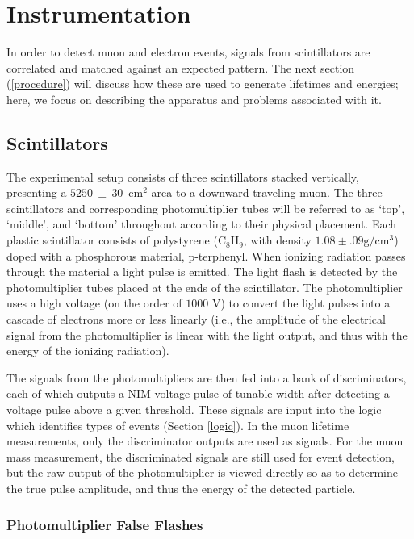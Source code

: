 \section{Instrumentation}
\label{instrumentation}

In order to detect muon and electron events, signals from scintillators are correlated and matched against an expected pattern. The next section (\ref{procedure}) will discuss how these are used to generate lifetimes and energies; here, we focus on describing the apparatus and problems associated with it.

\subsection{Scintillators}
\label{scintillators}

The experimental setup consists of three scintillators stacked vertically, presenting a $5250~\pm~30$~cm$^2$ area to a downward traveling muon. The three scintillators and corresponding photomultiplier tubes will be referred to as `top', `middle', and `bottom' throughout according to their physical placement.  Each plastic scintillator consists of polystyrene ($\mathrm{C}_{8}\mathrm{H}_{9}$, with density $1.08 \pm .09 {\mathrm{g}}/{\mathrm{cm}^{3}}$) doped with a phosphorous material, p-terphenyl. When ionizing radiation passes through the material a light pulse is emitted. The light flash is detected by the photomultiplier tubes placed at the ends of the scintillator. The photomultiplier uses a high voltage (on the order of $1000$ V) to convert the light pulses into a cascade of electrons more or less linearly (i.e., the amplitude of the electrical signal from the photomultiplier is linear with the light output, and thus with the energy of the ionizing radiation).

The signals from the photomultipliers are then fed into a bank of discriminators, each of which outputs a NIM voltage pulse of tunable width after detecting a voltage pulse above a given threshold. These signals are input into the logic which identifies types of events (Section \ref{logic}). In the muon lifetime measurements, only the discriminator outputs are used as signals. For the muon mass measurement, the discriminated signals are still used for event detection, but the raw output of the photomultiplier is viewed directly so as to determine the true pulse amplitude, and thus the energy of the detected particle. 

\subsubsection{Photomultiplier False Flashes}
\label{photomultiplierfalseflashes}

